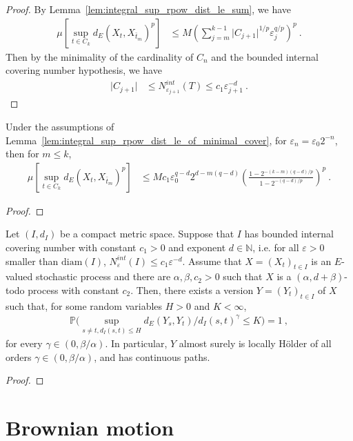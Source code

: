 \begin{proof}
By Lemma~\ref{lem:integral_sup_rpow_dist_le_sum}, we have
\begin{align*}
  \mu \left[\sup_{t \in C_k} d_E(X_t, X_{\bar{t}_m})^p \right]
  &\le M \left( \sum_{j=m}^{k-1} \vert C_{j+1} \vert^{1/p} \varepsilon_j^{q/p} \right)^p
  \: .
\end{align*}
Then by the minimality of the cardinality of $C_n$ and the bounded internal covering number hypothesis, we have
\begin{align*}
  \vert C_{j+1} \vert
  &\le N^{int}_{\varepsilon_{j+1}}(T)
  \le c_1 \varepsilon_{j+1}^{-d}
  \: .
\end{align*}
\end{proof}


\begin{corollary}\label{cor:integral_sup_rpow_dist_le_of_minimal_cover_two}
Under the assumptions of Lemma~\ref{lem:integral_sup_rpow_dist_le_of_minimal_cover}, for $\varepsilon_n = \varepsilon_0 2^{-n}$, then for $m \le k$,
\begin{align*}
  \mu \left[\sup_{t \in C_k} d_E(X_t, X_{\bar{t}_m})^p \right]
  &\le M c_1 \varepsilon_0^{q - d} 2^{d - m(q-d)}\left( \frac{1 - 2^{- (k - m) (q -d)/p}}{1 - 2^{- (q -d)/p}}\right)^p
  \: .
\end{align*}
\end{corollary}

\begin{proof}

\end{proof}


\begin{theorem} \label{thm:kolchen_general}
  \notready
Let $(I, d_I)$ be a compact metric space.
Suppose that $I$ has bounded internal covering number with constant $c_1>0$ and exponent $d \in \mathbb{N}$, i.e. for all $\varepsilon > 0$ smaller than $\mathrm{diam}(I)$, $N^{int}_\varepsilon(I) \le c_1 \varepsilon^{-d}$.
Assume that $X = (X_t)_{t\in I}$ is an $E$-valued stochastic process and there are $\alpha, \beta, c_2>0$ such that $X$ is a $(\alpha, d+\beta)$-todo process with constant $c_2$.
Then, there exists a version $Y = (Y_t)_{t\in I}$ of $X$ such that, for some random variables $H>0$ and $K<\infty$,
\begin{align*}
  \mathbb{P}\Big(\sup_{s\neq t, d_I(s,t) \leq H} d_E(Y_s, Y_t)/d_I(s,t)^\gamma
  \le K\Big) = 1
  \: ,
\end{align*}
for every $\gamma\in(0,\beta/\alpha)$.
In particular, $Y$ almost surely is locally Hölder of all orders $\gamma \in (0,\beta/\alpha)$, and has continuous paths.
\end{theorem}

\begin{proof}

\end{proof}

\section{Brownian motion}
